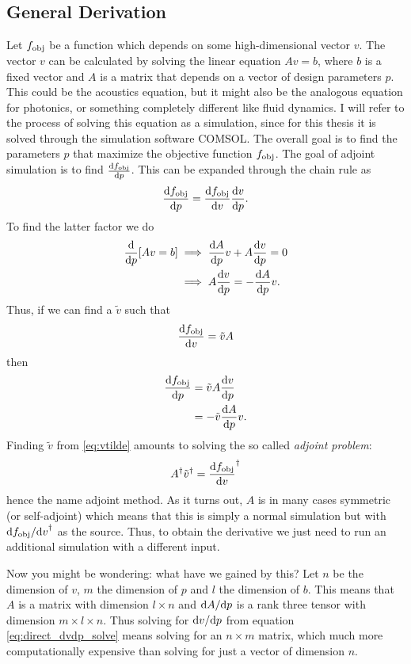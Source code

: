 \subsection{General Derivation}\label{sec:general_derivation}

Let $f_\text{obj}$ be a function which depends on some high-dimensional vector $v$.
The vector $v$ can be calculated by solving the linear equation
$A v = b$, where $b$ is a fixed vector and $A$ is a matrix that depends on a
vector of design parameters $p$.
This could be the acoustics equation, but it might also be the analogous
equation for photonics, or something completely different like fluid dynamics.
I will refer to the process of solving this equation as a simulation, since for
this thesis it is solved through the simulation software COMSOL.
The overall goal is to find the parameters $p$ that maximize the objective
function $f_\text{obj}$.
The goal of adjoint simulation is to find $\diff{\fobj}{p}$.
This can be expanded through the chain rule as
\begin{equation}
	\diff{\fobj}{p} = \diff{\fobj}{v} \diff{v}{p}.
\end{equation}
To find the latter factor we do
\begin{align}
	\diff{}{p} [Av = b] &\implies \diff{A}{p} v + A \diff{v}{p} = 0\\
						&\implies A\diff{v}{p} = -\diff{A}{p}
						v.\label{eq:direct_dvdp_solve}
\end{align}
Thus, if we can find a $\tilde v$ such that
\begin{equation}\label{eq:vtilde}
	\diff{\fobj}{v} = \tilde v A
\end{equation}
then
\begin{align}
	\diff{\fobj}{p} &=
	\tilde v A \diff{v}{p}\\
	&=
	-\tilde v \diff{A}{p} v.
\end{align}
Finding $\tilde v$ from \cref{eq:vtilde} amounts to solving the so called
\emph{adjoint problem}:
\begin{equation}
	A^\dagger \tilde v^\dagger = \diff{\fobj}{v}^\dagger
\end{equation}
hence the name adjoint method.
As it turns out, $A$ is in many cases symmetric (or self-adjoint) which means that this is simply a normal
simulation but with $\difs{\fobj}{v}^\dagger$ as the source.
Thus, to obtain the derivative we just need to run an additional
simulation with a different input.

Now you might be wondering: what have we gained by this?
Let $n$ be the dimension of $v$, $m$ the dimension of $p$ and $l$ the dimension
of $b$.
This means that $A$ is a matrix with dimension $l\times n$ and $\difs{A}{p}$ is
a rank three tensor with dimension $m\times l\times n$.
Thus solving for $\difs{v}{p}$ from equation \cref{eq:direct_dvdp_solve}
means solving for an $n \times m$ matrix, which much more computationally
expensive than solving for just a vector of dimension $n$.


